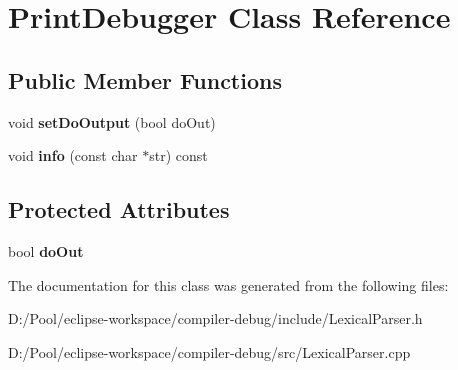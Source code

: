 \hypertarget{class_print_debugger}{}\section{Print\+Debugger Class Reference}
\label{class_print_debugger}
\subsection*{Public Member Functions}
\begin{DoxyCompactItemize}
\item 
\mbox{\label{class_print_debugger_af78b1c67e645c102544863bd5656312b}} 
void {\bfseries set\+Do\+Output} (bool do\+Out)
\item 
\mbox{\label{class_print_debugger_a74b128d8bb7e37549e14b7103c39338c}} 
void {\bfseries info} (const char $\ast$str) const
\end{DoxyCompactItemize}
\subsection*{Protected Attributes}
\begin{DoxyCompactItemize}
\item 
\mbox{\label{class_print_debugger_a391cf22a9917b4538d94f154fc34bb1e}} 
bool {\bfseries do\+Out}
\end{DoxyCompactItemize}


The documentation for this class was generated from the following files\+:\begin{DoxyCompactItemize}
\item 
D\+:/\+Pool/eclipse-\/workspace/compiler-\/debug/include/Lexical\+Parser.\+h\item 
D\+:/\+Pool/eclipse-\/workspace/compiler-\/debug/src/Lexical\+Parser.\+cpp\end{DoxyCompactItemize}
